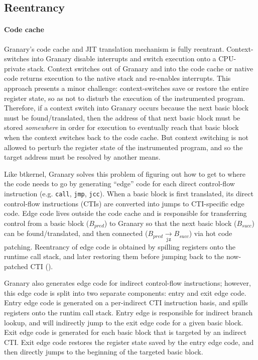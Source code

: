 \documentclass[preprint]{sigplanconf}
\begin{document}
\subsection{Reentrancy}

\paragraph{Code cache}
Granary's code cache and JIT translation mechanism is fully reentrant. Context-switches into Granary disable interrupts and switch execution onto a CPU-private stack. Context switches out of Granary and into the code cache or native code returns execution to the native stack and re-enables interrupts. This approach presents a minor challenge: context-switches save or restore the entire register state, so as not to disturb the execution of the instrumented program. Therefore, if a context switch into Granary occurs because the next basic block must be found/translated, then the address of that next basic block must be stored \emph{somewhere} in order for execution to eventually reach that basic block when the context switches back to the code cache. But context switching is not allowed to perturb the register state of the instrumented program, and so the target address must be resolved by another means.

Like btkernel, Granary solves this problem of figuring out how to get to where the code needs to go  by generating ``edge'' code for each direct control-flow instruction (e.g. \texttt{call}, \texttt{jmp}, \texttt{jcc}). When a basic block is first translated, its direct control-flow instructions (CTIs) are converted into jumps to CTI-specific edge code. Edge code lives outside the code cache and is responsible for transferring control from a basic block ($B_{pred}$) to Granary so that the next basic block ($B_{succ}$) can be found/translated, and then connected ($B_{pred} \underset{\texttt{jz}}{\to} B_{succ}$) via hot code patching. Reentrancy of edge code is obtained by spilling registers onto the runtime call stack, and later restoring them before jumping back to the now-patched CTI ().

Granary also generates edge code for indirect control-flow instructions; however, this edge code is split into two separate components: entry and exit edge code. Entry edge code is generated on a per-indirect CTI instruction basis, and spills registers onto the runtim call stack. Entry edge is responsible for indirect branch lookup, and will indirectly jump to the exit edge code for a given basic block. Exit edge code is generated for each basic block that is targeted by an indirect CTI. Exit edge code restores the register state saved by the entry edge code, and then directly jumps to the beginning of the targeted basic block.
\end{document}
